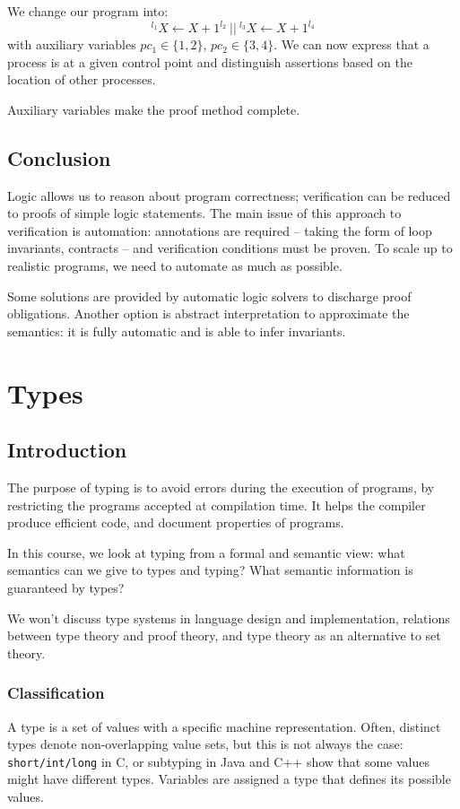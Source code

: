 \documentclass[toc]{../cs-classes/cs-classes}
\begin{document}
\begin{example}
    We change our program into:
    \begin{equation*}
        {}^{l_1}X\leftarrow X+1^{l_2} \:||\: {}^{l_3}X\leftarrow X+1^{l_4}
    \end{equation*}
    with auxiliary variables $pc_1\in\{1, 2\}$, $pc_2\in\{3, 4\}$. We can now express that a process is at a given control point and distinguish assertions based on the location of other processes.
\end{example}

Auxiliary variables make the proof method complete.

\subsection*{Conclusion}
Logic allows us to reason about program correctness; verification can be reduced to proofs of simple logic statements. The main issue of this approach to verification is automation: annotations are required -- taking the form of loop invariants, contracts -- and verification conditions must be proven. To scale up to realistic programs, we need to automate as much as possible. 

Some solutions are provided by automatic logic solvers to discharge proof obligations. Another option is abstract interpretation to approximate the semantics: it is fully automatic and is able to infer invariants.


\section{Types}
\subsection{Introduction}
The purpose of typing is to avoid errors during the execution of programs, by restricting the programs accepted at compilation time. It helps the compiler produce efficient code, and document properties of programs.

In this course, we look at typing from a formal and semantic view: what semantics can we give to types and typing? What semantic information is guaranteed by types?

We won't discuss type systems in language design and implementation, relations between type theory and proof theory, and type theory as an alternative to set theory.

\subsubsection{Classification}
A type is a set of values with a specific machine representation. Often, distinct types denote non-overlapping value sets, but this is not always the case: \texttt{short/int/long} in C, or subtyping in Java and C++ show that some values might have different types. Variables are assigned a type that defines its possible values.
\end{document}
